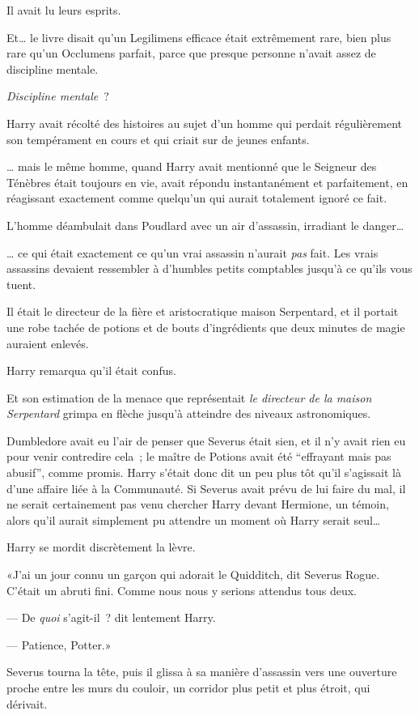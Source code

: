 Il avait lu leurs esprits.

Et… le livre disait qu'un Legilimens efficace était extrêmement rare, bien plus rare qu'un Occlumens parfait, parce que presque personne n'avait assez de discipline mentale.

\emph{Discipline mentale}~?

Harry avait récolté des histoires au sujet d'un homme qui perdait régulièrement son tempérament en cours et qui criait sur de jeunes enfants.

… mais le même homme, quand Harry avait mentionné que le Seigneur des Ténèbres était toujours en vie, avait répondu instantanément et parfaitement, en réagissant exactement comme quelqu'un qui aurait totalement ignoré ce fait.

L'homme déambulait dans Poudlard avec un air d'assassin, irradiant le danger…

… ce qui était exactement ce qu'un vrai assassin n'aurait \emph{pas} fait. Les vrais assassins devaient ressembler à d'humbles petits comptables jusqu'à ce qu'ils vous tuent.

Il était le directeur de la fière et aristocratique maison Serpentard, et il portait une robe tachée de potions et de bouts d'ingrédients que deux minutes de magie auraient enlevés.

Harry remarqua qu'il était confus.

Et son estimation de la menace que représentait \emph{le directeur de la maison Serpentard} grimpa en flèche jusqu'à atteindre des niveaux astronomiques.

Dumbledore avait eu l'air de penser que Severus était sien, et il n'y avait rien eu pour venir contredire cela~; le maître de Potions avait été “effrayant mais pas abusif”, comme promis. Harry s'était donc dit un peu plus tôt qu'il s'agissait là d'une affaire liée à la Communauté. Si Severus avait prévu de lui faire du mal, il ne serait certainement pas venu chercher Harry devant Hermione, un témoin, alors qu'il aurait simplement pu attendre un moment où Harry serait seul…

Harry se mordit discrètement la lèvre.

«J'ai un jour connu un garçon qui adorait le Quidditch, dit Severus Rogue. C'était un abruti fini. Comme nous nous y serions attendus tous deux.

--- De \emph{quoi} s'agit-il~? dit lentement Harry.

--- Patience, Potter.»

Severus tourna la tête, puis il glissa à sa manière d'assassin vers une ouverture proche entre les murs du couloir, un corridor plus petit et plus étroit, qui dérivait.

